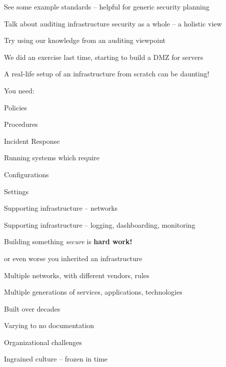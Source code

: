 \documentclass[Screen16to9,17pt]{foils}
\begin{document}
\begin{list2}
\item See some example standards -- helpful for generic security planning
\item Talk about auditing infrastructure security as a whole -- a holistic view
\item Try using our knowledge from an auditing viewpoint
\end{list2}



\begin{list1}
\item We did an exercise last time, starting to build a DMZ for servers
\item A real-life setup of an infrastructure from scratch can be daunting!
\item You need:
\begin{list2}
\item Policies
\item Procedures
\item Incident Response
\end{list2}
\item Running systems which require
\begin{list2}
\item Configurations
\item Settings
\item Supporting infrastructure -- networks
\item Supporting infrastructure -- logging, dashboarding, monitoring
\end{list2}
\item Building something \emph{secure} is {\bf hard work!}
\end{list1}




\begin{list1}
\item or even worse you inherited an infrastructure
\item Multiple networks, with different vendors, rules
\item Multiple generations of services, applications, technologies
\item Built over decades
\item Varying to no documentation
\item Organizational challenges
\item Ingrained culture -- frozen in time
\end{list1}
\end{document}
